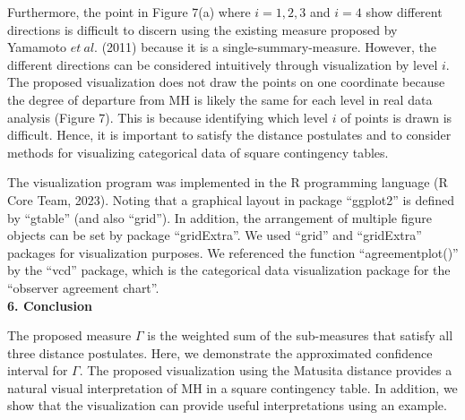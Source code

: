 \documentclass[a4j,12pt]{article}
\begin{document}
Furthermore, the point in Figure 7(a) where $i=1, 2, 3$ and $i=4$ show different directions is difficult to discern using the existing measure proposed by Yamamoto $et~al.$ (2011) because it is a single-summary-measure. 
However, the different directions can be considered intuitively through visualization by level $i$.
The proposed visualization does not draw the points on one coordinate because the degree of departure from MH is likely the same for each level in real data analysis (Figure 7). 
This is because identifying which level $i$ of points is drawn is difficult. 
Hence, it is important to satisfy the distance postulates and to consider methods for visualizing categorical data of square contingency tables.

The visualization program was implemented in the R programming language (R Core Team, 2023). 
Noting that a graphical layout in package ``ggplot2'' is defined by ``gtable'' (and also ``grid''). 
In addition, the arrangement of multiple figure objects can be set by package ``gridExtra''.
We used ``grid'' and ``gridExtra'' packages for visualization purposes. 
We referenced the function ``agreementplot()'' by the ``vcd'' package, which is the categorical data visualization package for the ``observer agreement chart''.
\\


\noindent \textbf{\large 6. Conclusion}

The proposed measure $\Gamma$ is the weighted sum of the sub-measures that satisfy all three distance postulates. 
Here, we demonstrate the approximated confidence interval for $\Gamma$.
The proposed visualization using the Matusita distance provides a natural visual interpretation of MH in a square contingency table. 
In addition, we show that the visualization can provide useful interpretations using an example.
\\
\end{document}
